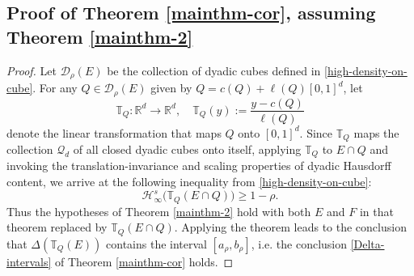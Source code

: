 \documentclass[a4paper,11pt]{amsart}
\numberwithin{equation}{section}
\begin{document}
\subsection{Proof of Theorem \ref{mainthm-cor}, assuming Theorem \ref{mainthm-2}} \label{mainthm-cor-proof-section}
\begin{proof} 
Let $\mathcal D_{\rho}(E)$ be the collection of dyadic cubes defined in \eqref{high-density-on-cube}. 
For any $Q \in \mathcal D_{\rho}(E)$ given by $Q = c(Q) + \ell(Q) [0,1]^d$, let 
\[ \mathbb T_{Q}: \mathbb R^d \rightarrow \mathbb R^d, \quad \mathbb T_Q(y) := \frac{y-c(Q)}{\ell(Q)} \] denote the linear transformation that maps $Q$ onto $[0,1]^d$. Since $\mathbb T_{Q}$ maps the collection $\mathcal Q_d$ of all closed dyadic cubes onto itself, applying $\mathbb T_{Q}$ to $E \cap Q$ and invoking the translation-invariance and scaling properties of dyadic Hausdorff content, we arrive at the following inequality  from \eqref{high-density-on-cube}:
\[ \mathcal H^s_{\infty}\bigl(\mathbb T_{Q}(E \cap Q) \bigr) \geq 1 - \rho. \] 
Thus the hypotheses of Theorem \ref{mainthm-2} hold with both $E$ and $F$ in that theorem replaced by $\mathbb T_{Q}(E \cap Q)$. Applying the theorem leads to the conclusion that $\Delta(\mathbb T_{Q}(E))$ contains the interval $[a_{\rho}, b_{\rho}]$, i.e. the conclusion \eqref{Delta-intervals} of Theorem \ref{mainthm-cor} holds.
\end{proof} 
\end{document}
